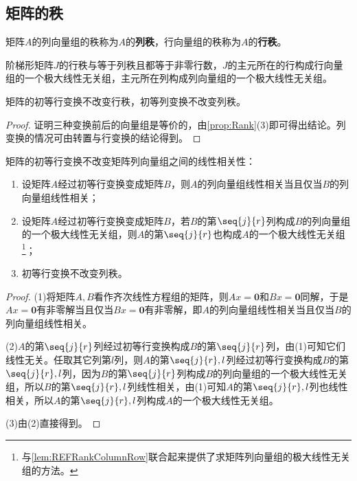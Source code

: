 \subsection{矩阵的秩}
\begin{definition}
	矩阵$A$的列向量组的秩称为$A$的\textbf{列秩}，行向量组的秩称为$A$的\textbf{行秩}。
\end{definition}
\begin{lemma}\label{lem:REFRankColumnRow}
	阶梯形矩阵$J$的行秩与等于列秩且都等于非零行数，$J$的主元所在的行构成行向量组的一个极大线性无关组，主元所在列构成列向量组的一个极大线性无关组。
\end{lemma}
\begin{lemma}\label{lem:ElementaryRowColumnTransRank}
	矩阵的初等行变换不改变行秩，初等列变换不改变列秩。
\end{lemma}
\begin{proof}
	证明三种变换前后的向量组是等价的，由\cref{prop:Rank}(3)即可得出结论。列变换的情况可由转置与行变换的结论得到。
\end{proof}
\begin{lemma}\label{lem:ElementaryRowSameColumn}
	矩阵的初等行变换不改变矩阵列向量组之间的线性相关性：
	\begin{enumerate}
		\item 设矩阵$A$经过初等行变换变成矩阵$B$，则$A$的列向量组线性相关当且仅当$B$的列向量组线性相关；
		\item 设矩阵$A$经过初等行变换变成矩阵$B$，若$B$的第$\seq{j}{r}$列构成$B$的列向量组的一个极大线性无关组，则$A$的第$\seq{j}{r}$也构成$A$的一个极大线性无关组\footnote{与\cref{lem:REFRankColumnRow}联合起来提供了求矩阵列向量组的极大线性无关组的方法。}；
		\item 初等行变换不改变列秩。
	\end{enumerate}
\end{lemma}
\begin{proof}
	(1)将矩阵$A,B$看作齐次线性方程组的矩阵，则$Ax=\mathbf{0}$和$Bx=\mathbf{0}$同解，于是$Ax=\mathbf{0}$有非零解当且仅当$Bx=\mathbf{0}$有非零解，即$A$的列向量组线性相关当且仅当$B$的列向量组线性相关。\par
	(2)$A$的第$\seq{j}{r}$列经过初等行变换构成$B$的第$\seq{j}{r}$列，由(1)可知它们线性无关。任取其它列第$l$列，则$A$的第$\seq{j}{r},l$列经过初等行变换构成$B$的第$\seq{j}{r},l$列，因为$B$的第$\seq{j}{r}$列构成$B$的列向量组的一个极大线性无关组，所以$B$的第$\seq{j}{r},l$列线性相关，由(1)可知$A$的第$\seq{j}{r},l$列也线性相关，所以$A$的第$\seq{j}{r},l$列构成$A$的一个极大线性无关组。\par
	(3)由(2)直接得到。
\end{proof}
